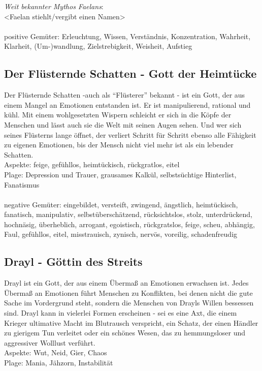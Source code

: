 \textit{Weit bekannter Mythos Faelans}:\\
<Faelan stiehlt/vergibt einen Namen>  \\~\\
positive Gemüter: Erleuchtung, Wissen, Verständnis, Konzentration, Wahrheit, Klarheit, (Um-)wandlung, Zielstrebigkeit, Weisheit, Aufstieg


\subsection{\textbf{Der Flüsternde Schatten} - Gott der Heimtücke}
Der Flüsternde Schatten -auch als ``Flüsterer'' bekannt - ist ein Gott, der aus einem Mangel an Emotionen entstanden ist. Er ist manipulierend, rational und kühl. Mit einem 
wohlgesetzten Wispern schleicht er sich in die Köpfe der Menschen und lässt auch sie die Welt mit seinen Augen sehen. Und wer sich seines Flüsterns lange öffnet, der verliert 
Schritt für Schritt ebenso alle Fähigkeit zu eigenen Emotionen, bis der Mensch nicht viel mehr ist als ein lebender Schatten.\\
Aspekte: feige, gefühllos, heimtückisch, rückgratlos, eitel\\
Plage: Depression und Trauer, grausames Kalkül, selbstsüchtige Hinterlist, Fanatismus\\~\\

negative Gemüter: eingebildet, versteift, zwingend, ängstlich, heimtückisch, fanatisch, manipulativ, selbstüberschätzend, rücksichtslos, stolz, unterdrückend, hochnäsig,
überheblich, arrogant, egoistisch, rückgratslos, feige, scheu, abhängig, Faul, gefühllos, eitel, misstrauisch, zynisch, nervös, voreilig, schadenfreudig

\subsection{\textbf{Drayl} - Göttin des Streits}
Drayl ist ein Gott, der aus einem Übermaß an Emotionen erwachsen ist. Jedes Übermaß an Emotionen führt Menschen zu Konflikten, bei denen nicht die gute Sache im Vordergrund 
steht, sondern die Menschen von Drayls Willen bessessen sind. Drayl kann in vielerlei Formen erscheinen - sei es eine Axt, die einem Krieger ultimative Macht im Blutrausch 
verspricht, ein Schatz, der einen Händler zu gierigem Tun verleitet oder ein schönes Wesen, das zu hemmungsloser und aggressiver Wolllust verführt.\\
Aspekte: Wut, Neid, Gier, Chaos\\
Plage: Mania, Jähzorn, Instabilität\\~\\

